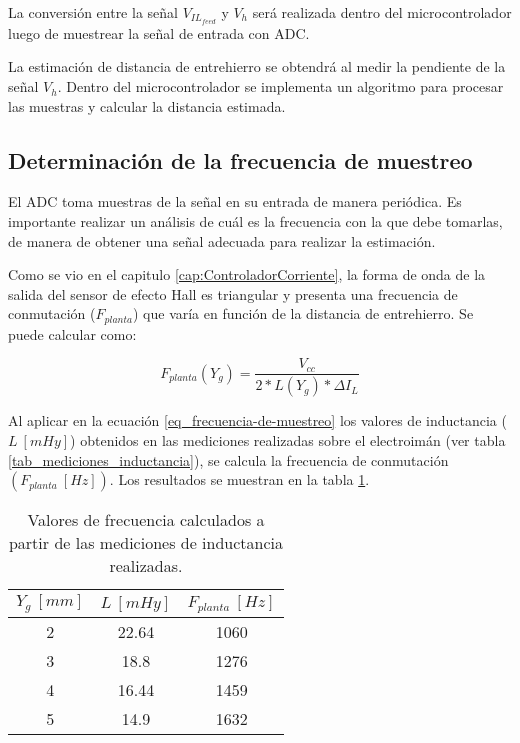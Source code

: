 La conversión entre la señal $V_{IL_{feed}}$ y $V_h$ será realizada dentro del microcontrolador luego de muestrear la señal de entrada con ADC.

La estimación de distancia de entrehierro se obtendrá al medir la pendiente de la señal $V_h$. Dentro del microcontrolador se implementa un algoritmo para procesar las muestras y calcular la distancia estimada. 

\subsection{Determinación de la frecuencia de muestreo}

El ADC toma muestras de la señal en su entrada de manera periódica. Es importante realizar un análisis de cuál es la frecuencia con la que debe tomarlas, de manera de obtener una señal adecuada para realizar la estimación.

Como se vio en el capitulo \ref{cap:ControladorCorriente}, la forma de onda de la salida del sensor de efecto Hall es triangular y presenta una frecuencia de conmutación ($F_{planta}$) que varía en función de la distancia de entrehierro. Se puede calcular como:

\begin{equation} \label{eq_frecuencia-de-muestreo}
	F_{planta}(Y_g)=\frac{V_{cc}}{2 * L(Y_g) * \Delta I_L}
\end{equation}


Al aplicar en la ecuación \ref{eq_frecuencia-de-muestreo} los valores de inductancia ($L\:[mHy]$) obtenidos en las mediciones realizadas sobre el electroimán (ver tabla \ref{tab_mediciones_inductancia}), se calcula la frecuencia de conmutación  $(F_{planta}\:[Hz])$. Los resultados se muestran en la tabla \ref{frecuencias-calculadas}.



\begin{table}[H]
	\begin{center}
		\begin{tabular}{| c | c | c |}
			\hline
			$Y_g\:[mm]$ & $L\:[mHy]$ & $F_{planta}\:[Hz]$\\ \hline
			2 & 22.64 & 1060\\ \hline
			3 & 18.8 & 1276\\ \hline
			4 & 16.44 & 1459\\ \hline
			5 & 14.9 & 1632\\ \hline
		\end{tabular}
		\caption{Valores de frecuencia calculados a partir de las mediciones de inductancia realizadas.}
		\label{frecuencias-calculadas}
	\end{center}
\end{table}


